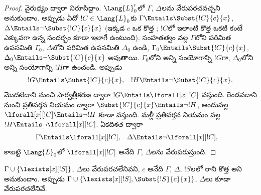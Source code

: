 \documentclass[../../../include/open-logic-section]{subfiles}
\begin{document}
\begin{proof}
వైరుధ్యం ద్వారా నిరూపిద్దాం. $\Lang{L}'_0$లో
$\Gamma$, $\Delta$లను వేరుపరచవచ్చని అనుకుందాం. అప్పుడు ఏదో
$!C \in \Lang{L}_0$కు $\Gamma \Entails \Subst{!C}{c}{x}$,
$\Delta \Entails \lnot \Subst{!C}{c}{x}$ (ఇక్కడ $c$ ఒక కొత్త
; $!C$లో ఇలాంటి కొత్త
 ఒకటి కంటే ఎక్కువగా ఉన్న సందర్భం
కూడా ఇలాగే ఉంటుంది). సంహతత్వం వల్ల $\Gamma$లోని పరిమిత ఉపసమితి
$\Gamma_0$, $\Delta$లోని పరిమిత ఉపసమితి $\Delta_0$ ఉండి,
$\Gamma_0 \Entails \Subst{!C}{c}{x}$,
$\Delta_0 \Entails \lnot \Subst{!C}{c}{x}$ అవుతాయి. $\Gamma_0$లోని
అన్ని  సంయోగాన్ని $!G$గా,
$\Delta_0$లోని అన్ని  సంయోగాన్ని
$!H$గా ఉంచండి. అప్పుడు
\begin{align*}
  !G & \Entails \Subst{!C}{c}{x}, & !H  \Entails \lnot \Subst{!C}{c}{x}.
\end{align*}
మొదటిదాని నుంచి సార్వత్రీకరణ ద్వారా $!G \Entails
\lforall[x][!C]$ వస్తుంది. రెండవదాని నుంచి ప్రతివర్తన నియమం ద్వారా
$\Subst{!C}{c}{x} \Entails \lnot !H$, అందువల్ల
$\lforall[x][!C] \Entails \lnot !H$ కూడా వస్తుంది.
మళ్లీ ప్రతివర్తన నియమం వల్ల $!H \Entails \lnot \lforall[x][!C]$.
ఏకదిశత ద్వారా
\begin{align*}
  \Gamma &\Entails \lforall[x][!C], &
  \Delta & \Entails \lnot \lforall[x][!C],
\end{align*}
కాబట్టి $\Lang{L}_0$లో $\lforall[x][!C]$ అనేది $\Gamma$, $\Delta$లను
వేరుపరుస్తుంది.
\end{proof}

\begin{lem}
$\Gamma \cup \{ \lexists[x][!S] \}$, $\Delta$లు వేరుపరచలేనివని,
$c$ అనేది $\Gamma$, $\Delta$, $!S$లలో రాని కొత్త
 అని అనుకుందాం. అప్పుడు
$\Gamma \cup \{ \lexists[x][!S], \Subst{!S}{c}{x} \}$, $\Delta$లు
కూడా వేరుపరచలేనివే.
\end{lem}
\end{document}
